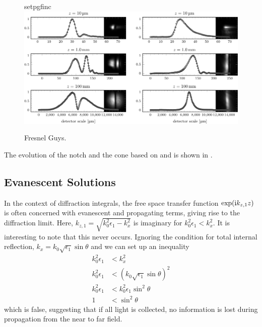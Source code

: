 \begin{figure}[ht]
 \centering
 {setpgfinc}
	\includegraphics{interference/figures/fig2-crop.pdf}
 \caption{Fresnel Guys.}
 \label{fig:fresnelprop}
\end{figure}
The evolution of the notch and the cone based on
 and  is shown in
.

\subsection{Evanescent Solutions}
In the context of diffraction integrals, the free space transfer function
$\exp({\mathrm{i}} k_{z,1} z)$ is often concerned with evanescent and propagating
terms, giving rise to the diffraction limit.  Here,
$k_{z,1}=\sqrt{k_0^2 \epsilon_1 - k_x^2}$ is imaginary for $k_0^2
\epsilon_1 < k_x^2$.  It is interesting to note that this never occurs.
Ignoring the condition for total internal reflection, 
$k_x = k_0 \sqrt{\epsilon_1} \sin \theta$ and we can set up an inequality
\begin{align}
k_0^2 \epsilon_1 &< k_x^2\\
k_0^2 \epsilon_1 &< \left(k_0 \sqrt{\epsilon_1} \sin \theta\right)^2\\
k_0^2 \epsilon_1 &< k_0^2 \epsilon_1 \sin^2 \theta\\
1 &< \sin^2 \theta
\end{align}
which is false, suggesting that if all light is collected, no information is
lost during propagation from the near to far field.
